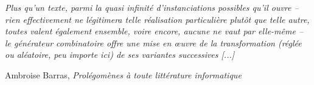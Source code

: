 \documentclass{article}
\newenvironment{citationbox}
{\begin{center}
		\begin{minipage}{.8\textwidth}
		}
		{
		\end{minipage}	
\end{center}
}
\begin{document}
					
					\begin{citationbox}
						\textit{Plus qu'un texte, parmi la quasi infinité d'instanciations possibles qu'il ouvre -- rien effectivement ne
					légitimera telle réalisation particulière plutôt que telle autre, toutes valent
					également ensemble, voire encore, aucune ne vaut par elle-même -- le
					générateur combinatoire offre une mise en œuvre de la transformation
					(réglée ou aléatoire, peu importe ici) de ses variantes successives [...]}
					\begin{flushright}
						Ambroise Barras, \textit{Prolégomènes à toute littérature informatique} \autocite{barras1995}
					\end{flushright}
					\end{citationbox}
				
\end{document}
